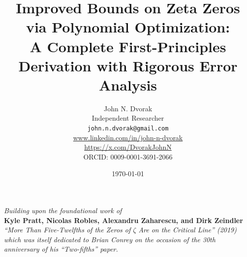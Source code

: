 \documentclass[11pt]{article}
\title{Improved Bounds on Zeta Zeros via Polynomial Optimization:\\
\large A Complete First-Principles Derivation with Rigorous Error Analysis}
\author{John N. Dvorak \\
\small Independent Researcher \\
\small \texttt{john.n.dvorak@gmail.com} \\
\small \url{www.linkedin.com/in/john-n-dvorak} \\
\small \url{https://x.com/DvorakJohnN} \\
\small ORCID: 0009-0001-3691-2066}
\date{\today}
\begin{document}
\maketitle

\begin{center}
\textit{Building upon the foundational work of}\\[3pt]
\textbf{Kyle Pratt, Nicolas Robles, Alexandru Zaharescu, and Dirk Zeindler}\\[3pt]
\textit{``More Than Five-Twelfths of the Zeros of $\zeta$ Are on the Critical Line'' (2019)}\\[6pt]
\textit{which was itself dedicated to Brian Conrey on the occasion of the 30th anniversary of his ``Two-fifths'' paper.}
\end{center}

\vspace{1em}
\end{document}
